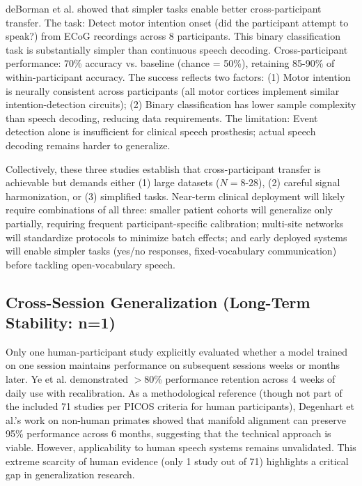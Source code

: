 deBorman et al. \cite{deBorman2024} showed that simpler tasks enable better cross-participant transfer. The task: Detect motor intention onset (did the participant attempt to speak?) from ECoG recordings across 8 participants. This binary classification task is substantially simpler than continuous speech decoding. Cross-participant performance: 70\% accuracy vs. baseline (chance = 50\%), retaining 85-90\% of within-participant accuracy. The success reflects two factors: (1) Motor intention is neurally consistent across participants (all motor cortices implement similar intention-detection circuits); (2) Binary classification has lower sample complexity than speech decoding, reducing data requirements. The limitation: Event detection alone is insufficient for clinical speech prosthesis; actual speech decoding remains harder to generalize.

Collectively, these three studies establish that cross-participant transfer is achievable but demands either (1) large datasets ($N = 8$-$28$), (2) careful signal harmonization, or (3) simplified tasks. Near-term clinical deployment will likely require combinations of all three: smaller patient cohorts will generalize only partially, requiring frequent participant-specific calibration; multi-site networks will standardize protocols to minimize batch effects; and early deployed systems will enable simpler tasks (yes/no responses, fixed-vocabulary communication) before tackling open-vocabulary speech.

\subsection{Cross-Session Generalization (Long-Term Stability: n=1)}

Only one human-participant study explicitly evaluated whether a model trained on one session maintains performance on subsequent sessions weeks or months later. Ye et al. \cite{Ye2025} demonstrated $>$80\% performance retention across 4 weeks of daily use with recalibration. As a methodological reference (though not part of the included 71 studies per PICOS criteria for human participants), Degenhart et al.'s work on non-human primates showed that manifold alignment can preserve 95\% performance across 6 months, suggesting that the technical approach is viable. However, applicability to human speech systems remains unvalidated. This extreme scarcity of human evidence (only 1 study out of 71) highlights a critical gap in generalization research.

